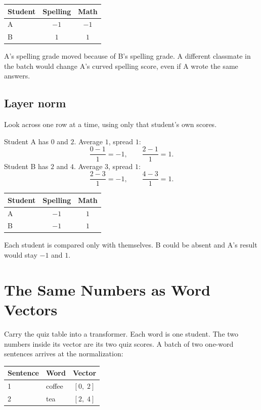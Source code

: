 \documentclass[11pt]{article}
\begin{document}
\begin{center}
\begin{tabular}{@{}lcc@{}}
\toprule
Student & Spelling & Math \\
\midrule
A & \(-1\) & \(-1\) \\
B & \(1\) & \(1\) \\
\bottomrule
\end{tabular}
\end{center}

A's spelling grade moved because of B's spelling grade. A different
classmate in the batch would change A's curved spelling score, even if A
wrote the same answers.

\subsection{Layer norm}

Look across one row at a time, using only that student's own scores.

Student A has \(0\) and \(2\). Average \(1\), spread \(1\):
\[
  \frac{0-1}{1} = -1,
  \qquad
  \frac{2-1}{1} = 1.
\]
Student B has \(2\) and \(4\). Average \(3\), spread \(1\):
\[
  \frac{2-3}{1} = -1,
  \qquad
  \frac{4-3}{1} = 1.
\]

\begin{center}
\begin{tabular}{@{}lcc@{}}
\toprule
Student & Spelling & Math \\
\midrule
A & \(-1\) & \(1\) \\
B & \(-1\) & \(1\) \\
\bottomrule
\end{tabular}
\end{center}

Each student is compared only with themselves. B could be absent and A's
result would stay \(-1\) and \(1\).

\section{The Same Numbers as Word Vectors}

Carry the quiz table into a transformer. Each word is one student. The two
numbers inside its vector are its two quiz scores. A batch of two one-word
sentences arrives at the normalization:

\begin{center}
\begin{tabular}{@{}llc@{}}
\toprule
Sentence & Word & Vector \\
\midrule
1 & coffee & \([0,\; 2]\) \\
2 & tea & \([2,\; 4]\) \\
\bottomrule
\end{tabular}
\end{center}
\end{document}
